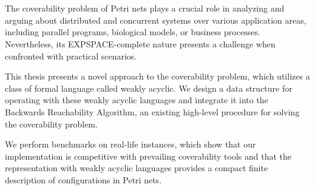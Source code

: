 \chapter{\abstractname}


The coverability problem of Petri nets plays a crucial role in analyzing and arguing about distributed and concurrent systems over various application areas, including parallel programs, biological models, or business processes. 
Nevertheless, its EXPSPACE-complete nature presents a challenge when confronted with practical scenarios. 

This thesis presents a novel approach to the coverability problem, which utilizes a class of formal language called weakly acyclic. We design a data structure for operating with these weakly acyclic languages and integrate it into the Backwards Reachability Algorithm, an existing high-level procedure for solving the coverability problem. 

We perform benchmarks on real-life instances, which show that our implementation is competitive with prevailing coverability tools and that the representation with weakly acyclic languages provides a compact finite description of configurations in Petri nets. 